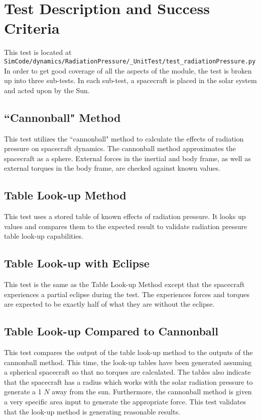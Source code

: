 \section{Test Description and Success Criteria}
This test is located at {\tt SimCode/dynamics/RadiationPressure/\_UnitTest/test\_radiationPressure.py} In order to get good coverage of all the aspects of the module, the test is broken up into three sub-tests. In each sub-test, a spacecraft is placed in the solar system and acted upon by the Sun. \par

\subsection{``Cannonball" Method} This test utilizes the ``cannonball" method to calculate the effects of radiation pressure on spacecraft dynamics. The cannonball method approximates the spacecraft as a sphere. External forces in the inertial and body frame, as well as external torques in the body frame, are checked against known values.
\subsection{Table Look-up Method} This test uses a stored table of known effects of radiation pressure. It looks up values and compares them to the expected result to validate radiation pressure table look-up capabilities.
\subsection{Table Look-up with Eclipse} This test is the same as the Table Look-up Method except that the spacecraft experiences a partial eclipse during the test. The experiences forces and torques are expected to be exactly half of what they are without the eclipse.
\subsection{Table Look-up Compared to Cannonball} This test compares the output of the table look-up method to the outputs of the cannonball method. This time, the look-up tables have been generated assuming a spherical spacecraft so that no torques are calculated. The tables also indicate that the spacecraft has a radius which works with the solar radiation pressure to generate a 1 $N$ away from the sun. Furthermore, the cannonball method is given a very specific area input to generate the appropriate force. This test validates that the look-up method is generating reasonable results.

